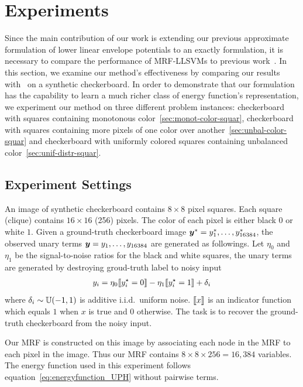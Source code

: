 \section{Experiments}
\label{sec:synth-check}

Since the main contribution of our work is extending our previous
approximate formulation of lower linear envelope potentials to an
exactly formulation, it is necessary to compare the performance
of MRF-LLSVMs to previous work~\cite{gouldlearning}. In this
section, we examine our method's effectiveness by comparing our
results with~\cite{gouldlearning,Gould:ICML2011} on a synthetic
checkerboard. In order to demonstrate that our formulation has
the capability to learn a much richer class of energy function's
representation, we experiment our method on three different
problem instances: checkerboard with squares containing
monotonous color~\ref{sec:monot-color-squar}, checkerboard with
squares containing more pixels of one color over
another~\ref{sec:unbal-color-squar} and checkerboard with
uniformly colored squares containing unbalanced
color~\ref{sec:unif-distr-squar}.

\subsection{Experiment Settings}
\label{sec:experiment-settings}

An image of synthetic checkerboard contains $8 \times 8$ pixel
squares. Each square (clique) contains $16 \times 16$ (256)
pixels. The color of each pixel is either black $0$ or white $1$.
Given a ground-truth checkerboard image
${\bm{y}}^*=y^*_1,\dots,y^*_{16384}$, the observed unary terms
${\bm{y}}=y_1,\dots,y_{16384}$ are generated as followings. Let
$\eta_0$ and $\eta_1$ be the signal-to-noise ratios for the black
and white squares, the unary terms are generated by destroying
groud-truth label to noisy input
\begin{align}
  \label{eq:noisy_checkerboard}
  y_i = \eta_0 \ind{y^\star_i = 0} - \eta_1 \ind{y^\star_i = 1} + \delta_i
\end{align}
where $\delta_i
\sim {\mathbb{U}}(-1, 1)$ is additive i.i.d.\ uniform noise. $\ind{x}$ is
an indicator function which equals $1$ when $x$ is true and $0$
otherwise. The task is to recover the ground-truth checkerboard
from the noisy input.

Our MRF is constructed on this image by associating each node in
the MRF to each pixel in the image. Thus our MRF contains $8
\times 8 \times 256 = 16,384$ variables. The energy function used
in this experiment follows equation~\eqref{eq:energyfunction_UPH}
without pairwise terms.

